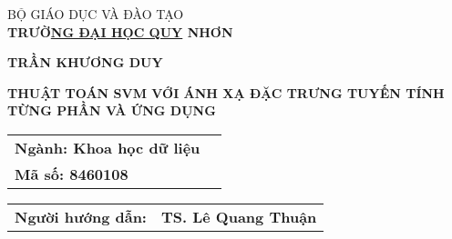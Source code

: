 \newpage
\thispagestyle{empty}
\begin{center}
\large BỘ GIÁO DỤC VÀ ĐÀO TẠO\\
{\bf \large TRƯỜ\underline{NG ĐẠI HỌC QUY} NHƠN}

\vspace*{2.5cm}

{\bf \large TRẦN KHƯƠNG DUY}
\vspace*{2cm}

\begin{center}
\Large{\textbf{ THUẬT TOÁN SVM VỚI ÁNH XẠ ĐẶC TRƯNG TUYẾN TÍNH TỪNG PHẦN VÀ ỨNG DỤNG }}
\end{center}
\vspace*{2cm} 
  
\begin{tabular}{l  l }
 \fontsize{12pt}{26}\selectfont \textbf{Ngành: Khoa học dữ liệu} \\
 \fontsize{12pt}{26}\selectfont \textbf{Mã số: 8460108}
\end{tabular}
\vspace*{2cm}

\begin{tabular}{l l }
\bf\fontsize{14pt}{20}\selectfont Người hướng dẫn:&\bf\fontsize{14pt}{20}\selectfont TS. Lê Quang Thuận
\end{tabular}  

\vfill

\end{center}